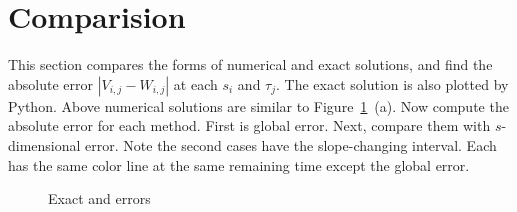 \section{Comparision}
	This section compares the forms of numerical and exact solutions, and find the absolute error $|V_{i,j}-W_{i,j}|$ at each $s_i$ and $\tau_j$. The exact solution is also plotted by Python. Above numerical solutions are similar to Figure~\ref{exact}~(a). Now compute the absolute error for each method. First is global error. Next, compare them with $s$-dimensional error. Note the second cases have the slope-changing interval. Each has the same color line at the same remaining time except the global error.
	\begin{figure}[h!]
		\hfill 
		\caption{Exact and errors}\label{exact}
	\end{figure}\\